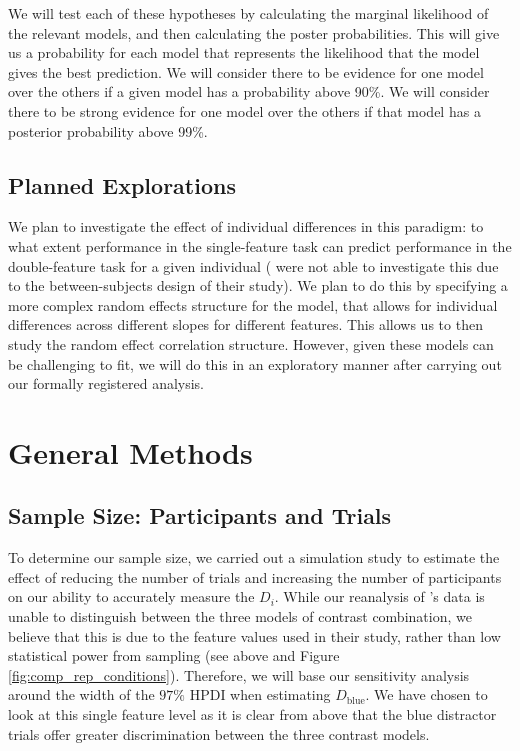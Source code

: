 \documentclass[smallextended, natbib]{svjour3}       %
\begin{document}
We will test each of these hypotheses by calculating the marginal likelihood of the relevant models, and then calculating the poster probabilities. This will give us a probability for each model that represents the likelihood that the model gives the best prediction. We will consider there to be evidence for one model over the others if a given model has a probability above 90\%. We will consider there to be strong evidence for one model over the others if that model has a posterior probability above 99\%.

\subsection{Planned Explorations}

We plan to investigate the effect of individual differences in this paradigm: to what extent performance in the single-feature task can predict performance in the double-feature task for a given individual (\cite{buetti2019predicting} were not able to investigate this due to the between-subjects design of their study). We plan to do this by specifying a more complex random effects structure for the model, that allows for individual differences across different slopes for different features. This allows us to then study the random effect correlation structure.  However, given these models can be challenging to fit, we will do this in an exploratory manner after carrying out our formally registered analysis.

\section{General Methods}

\subsection{Sample Size: Participants and Trials}

To determine our sample size, we carried out a simulation study to estimate the effect of reducing the number of trials and increasing the number of participants on our ability to accurately measure the $D_i$. While our reanalysis of \cite{buetti2019predicting}'s data is unable to distinguish between the three models of contrast combination, we believe that this is due to the feature values used in their study, rather than low statistical power from sampling (see above and Figure \ref{fig:comp_rep_conditions}). Therefore, we will base our sensitivity analysis around the width of the $97\%$ HPDI when estimating $D_{\text{blue}}$. We have chosen to look at this single feature level as it is clear from above that the blue distractor trials offer greater discrimination between the three contrast models.
\end{document}
